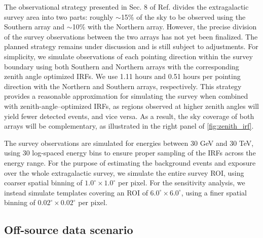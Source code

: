 \documentclass[aps,prd,a4paper,reprint,nofootinbib,superscriptaddress,floatfix,preprintnumbers]{revtex4-2}
\begin{document}
The observational strategy presented in Sec. 8 of Ref. \cite{CTAConsortium:2017dvg} divides the extragalactic survey area into two parts: roughly $\sim$15\% of the sky {to be} observed using the Southern array and $\sim$10\% with the Northern array. {However, the precise division of the survey observations between the two arrays has not yet been finalized. The planned strategy remains under discussion and is still subject to adjustments.} For simplicity, we simulate observations of each pointing direction within the survey boundary using both Southern and Northern arrays with the corresponding zenith angle optimized IRFs. We use 1.11 hours and 0.51 hours per pointing direction with the Northern and Southern arrays, respectively. {This strategy provides a reasonable approximation for simulating the survey when combined with zenith-angle–optimized IRFs, as regions observed at higher zenith angles will yield fewer detected events, and vice versa.}  As a result, the sky coverage of both arrays will be complementary, as {illustrated} in the right panel of \cref{fig:zenith_irf}.

The survey observations are simulated for energies between 30 GeV and 30 TeV, using 30 log-spaced energy bins to ensure proper sampling of the IRFs across the energy range. For the purpose of estimating the background events and exposure over the whole extragalactic survey, we simulate the entire survey ROI, using coarser spatial binning of $1.0^\circ \times 1.0^\circ$ per pixel. For the sensitivity analysis, we instead simulate templates covering an ROI of $6.0^\circ\times 6.0^\circ$, using a finer spatial binning of $0.02^\circ \times 0.02^\circ$ per pixel.

\subsection{Off-source data scenario}
\end{document}
